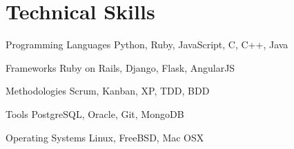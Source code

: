 \documentclass{tccv}
\begin{document}
\section{Technical Skills}

\begin{factlist}

\item{Programming Languages}
     {Python, Ruby, JavaScript, C, C++, Java}
     
\item{Frameworks}
     {Ruby on Rails, Django, Flask, AngularJS}
     
\item{Methodologies}
     {Scrum, Kanban, XP, TDD, BDD}

\item{Tools}
     {PostgreSQL, Oracle, Git, MongoDB}

\item{Operating Systems}
     {Linux, FreeBSD, Mac OSX}

\end{factlist}
\end{document}
